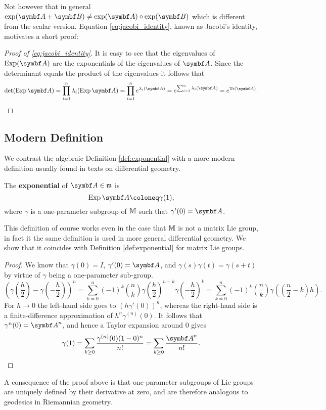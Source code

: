 Not however that in general $\exp(\A + \B) \neq \exp (\A) \circ \exp(\B)$ which is different from the scalar version. Equation \eqref{eq:jacobi_identity}, known as Jacobi's identity, motivates a short proof:
\begin{proof}[Proof of \eqref{eq:jacobi_identity}]
  It is easy to see that the eigenvalues of $\Exp(\A)$ are the exponentials of the eigenvalues of $\A$. Since the determinant equals the product of the eigenvalues it follows that
  \begin{equation}
    \det (\Exp \A) = \prod_{i=1}^n \lambda_i(\Exp \A) = \prod_{i=1}^n e^{\lambda_i(\A)} = e^{\sum_{i=1}^n \lambda_i(\A)} = e^{\tr(\A)}.
  \end{equation}
\end{proof}

\subsection{Modern Definition}

We contrast the algebraic Definition \ref{def:exponential} with a more modern definition usually found in texts on differential geometry.

\begin{definition}
  The \textbf{exponential} of $\A \in \lM$ is
  \begin{equation}
    \Exp \A \coloneq \gamma(1),
  \end{equation}
  where $\gamma$ is a one-parameter subgroup of $\mathbb{M}$ such that $\gamma'(0) = \A$.
\end{definition}
This definition of course works even in the case that $\mathbb{M}$ is not a matrix Lie group, in fact it the same definition is used in more general differential geometry. We show that it coincides with Definition \ref{def:exponential} for matrix Lie groups.

\begin{proof}
  We know that $\gamma(0) = I$, $\gamma'(0) = \A$, and $\gamma(s) \gamma(t) = \gamma(s + t)$ by virtue of $\gamma$ being a one-parameter sub-group.
  \begin{equation}
    \left( \gamma\left( \frac{h}{2} \right) - \gamma \left( -\frac{h}{2} \right)\right)^n = \sum_{k=0}^n (-1)^{k} \binom{n}{k} \gamma\left( \frac{h}{2} \right)^{n-k} \gamma\left(-\frac{h}{2} \right)^{k} = \sum_{k = 0}^n (-1)^{k} \binom{n}{k} \gamma\left( \left( \frac{n}{2} - k \right)  h  \right).
  \end{equation}
  For $h \rightarrow 0$ the left-hand side goes to $ \left( h \gamma'(0) \right)^n$, whereas the right-hand side is a finite-difference approximation of $h^n \gamma^{(n)}(0)$. It follows that $\gamma^{n}(0) = \A^n$, and hence a Taylor expansion around $0$ gives
  \begin{equation}
    \gamma(1) = \sum_{k \geq 0} \frac{\gamma^{(n)}(0) (1 - 0)^n}{n!} = \sum_{k \geq 0} \frac{\A^n}{n!}.
  \end{equation}
\end{proof}
A consequence of the proof above is that one-parameter subgroups of Lie groups are uniquely defined by their derivative at zero, and are therefore analogous to geodesics in Riemannian geometry.


